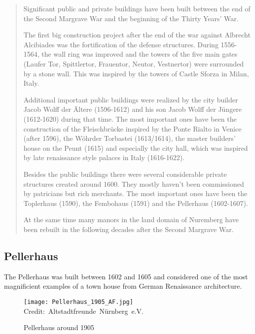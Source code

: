 \blockquote{
	Significant public and private buildings have been built between the end of the Second Margrave War and the beginning of the Thirty Years' War.
	
	The first big construction project after the end of the war against Albrecht Alcibiades was the fortification of the defense structures. During 1556-1564, the wall ring was improved and the towers of the five main gates (Laufer Tor, Spittlertor, Frauentor, Neutor, Vestnertor) were surrounded by a stone wall. This was inspired by the towers of Castle Sforza in Milan, Italy.
	
	Additional important public buildings were realized by the city builder Jacob Wolff der Ältere (1596-1612) and his son Jacob Wolff der Jüngere (1612-1620) during that time. The most important ones have been the construction of the Fleischbrücke inspired by the Ponte Rialto in Venice (after 1596), the Wöhrder Torbastei (1613/1614), the master builders' house on the Peunt (1615) and especially the city hall, which was inspired by late renaissance style palaces in Italy (1616-1622).
	
	Besides the public buildings there were several considerable private structures created around 1600. They mostly haven't been commissioned by patricians but rich merchants. The most important ones have been the Toplerhaus (1590), the Fembohaus (1591) and the Pellerhaus (1602-1607).
	
	At the same time many manors in the land domain of Nuremberg have been rebuilt in the following decades after the Second Margrave War.	
}


\pagebreak

\subsection{Pellerhaus}

The Pellerhaus was built between 1602 and 1605 and considered one of the most magnificient examples of a town house from German Renaissance architecture.

\begin{wrapfigure}{r}{0.5\textwidth}
	
	\centering
	
	\texttt{[image: Pellerhaus\_1905\_AF.jpg]}
	\hbox{\scriptsize Credit: Altstadtfreunde Nürnberg e.V.}
	\caption{Pellerhaus around 1905}
	\label{fig:pellerhaus_1905}
	\vspace{-10pt}
	
\end{wrapfigure}

